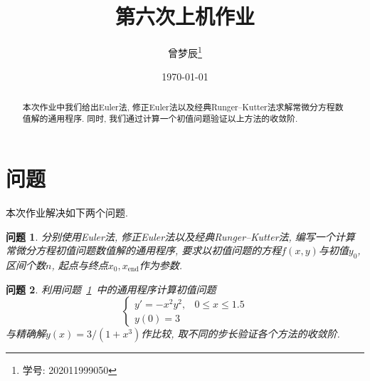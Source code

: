 \documentclass[a4paper]{article}
\title{第六次上机作业}
\author{曾梦辰\thanks{学号: 202011999050}}
\date{\today}
\theoremstyle{plain}
\newtheorem{pro}{问题}
\theoremstyle{remark}
\numberwithin{equation}{section}
\begin{document}
\maketitle

\begin{abstract}
    本次作业中我们给出Euler法, 修正Euler法以及经典Runger--Kutter法求解常微分方程数值解的通用程序.
    同时, 我们通过计算一个初值问题验证以上方法的收敛阶.
\end{abstract}

\section{问题}
本次作业解决如下两个问题.
\begin{pro}\label{pro1}
    分别使用Euler法, 修正Euler法以及经典Runger--Kutter法, 编写一个计算常微分方程初值问题数值解的通用程序, 要求以初值问题的方程$f(x,y)$与初值$y_0$, 区间个数$n$, 起点与终点$x_0,x_{\mathrm{end}}$作为参数.
\end{pro}

\begin{pro}
    利用问题~\ref{pro1}~中的通用程序计算初值问题
    \begin{equation}
        \begin{cases}
            y'=-x^2y^2,& 0\leq x\leq 1.5\\
            y(0)=3
        \end{cases}\label{ode}
    \end{equation}
    与精确解$y(x)=3/(1+x^3)$作比较, 取不同的步长验证各个方法的收敛阶.
\end{pro}
\end{document}
